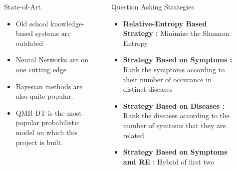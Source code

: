 \documentclass[final]{beamer}
\newlength{\sepwid}
\newlength{\onecolwid}
\newlength{\twocolwid}
\begin{document}
\begin{frame}
\begin{columns}[t]
\begin{column}{\onecolwid}
\end{column} %

\begin{column}{\sepwid}\end{column} %

\begin{column}{\twocolwid} %

\begin{columns}[t,totalwidth=\twocolwid] %

\begin{column}{\onecolwid}\vspace{-.74in} %


\begin{exampleblock}{State-of-Art}
\begin{itemize}
\item Old school knowledge-based systems are outdated
\item Neural Networks are on one cutting edge 
\item Bayesian methods are also quite popular. 
\item QMR-DT is the most popular probabilistic model on which this project is built.
\end{itemize}


\end{exampleblock}



\end{column} %
\begin{column}{\sepwid}\end{column} %

\begin{column}{\onecolwid}\vspace{-.74in} %



\begin{exampleblock}{Question Asking Strategies}


\begin{itemize}
\item \textbf{Relative-Entropy Based Strategy :} Minimize the Shannon Entropy
\item \textbf{Strategy Based on Symptoms :} Rank the symptoms according to their number of occurance in distinct diseases
\item \textbf{Strategy Based on Diseases :} Rank the diseases according to the number of symtoms that they are related
\item \textbf{Strategy Based on Symptoms and RE :} Hybrid of first two
\end{itemize}


\end{exampleblock}
\end{column}
\end{columns}
\end{column}
\end{columns}
\end{frame}
\end{document}
